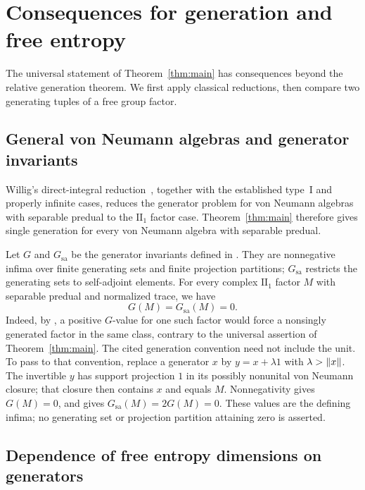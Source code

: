 \section{Consequences for generation and free entropy}
\label{sec:consequences}

The universal statement of Theorem~\ref{thm:main} has consequences
beyond the relative generation theorem. We first apply classical
reductions, then compare two generating tuples of a free group factor.

\subsection{General von Neumann algebras and generator invariants}

Willig's direct-integral reduction~\cite[Corollary~2]{Willig1974},
together with the established type~I and properly infinite cases,
reduces the generator problem for von Neumann algebras with separable
predual to the $\mathrm{II}_1$ factor case. Theorem~\ref{thm:main}
therefore gives single generation for every von Neumann algebra with
separable predual.

Let $G$ and $G_{\mathrm{sa}}$ be the generator invariants defined in
\cite[Definition~2.7]{DSSW2008}. They are nonnegative infima over
finite generating sets and finite projection partitions;
$G_{\mathrm{sa}}$ restricts the generating sets to self-adjoint
elements. For every complex $\mathrm{II}_1$ factor $M$ with separable
predual and normalized trace, we have
\[
 G(M)=G_{\mathrm{sa}}(M)=0.
\]
Indeed, by \cite[Corollary~5.1]{DSSW2008}, a positive $G$-value for
one such factor would force a nonsingly generated factor in the same
class, contrary to the universal assertion of
Theorem~\ref{thm:main}. The cited generation convention need not
include the unit. To pass to that convention, replace a generator
$x$ by $y=x+\lambda1$ with $\lambda>\lVert x\rVert$. The invertible $y$
has support projection $1$ in its possibly nonunital von Neumann
closure; that closure then contains $x$ and equals $M$.
Nonnegativity gives $G(M)=0$, and
\cite[Theorem~5.5]{DSSW2008} gives
$G_{\mathrm{sa}}(M)=2G(M)=0$. These values are the defining infima;
no generating set or projection partition attaining zero is asserted.

\subsection{Dependence of free entropy dimensions on generators}

